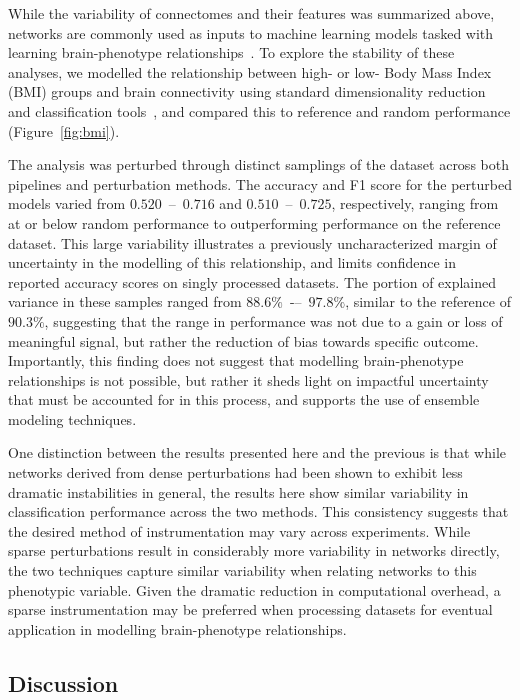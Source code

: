 \documentclass[fleqn,10pt]{SelfArx} %
\newcommand{\new}[1]{{\color{blue} #1}}
\begin{document}
While the variability of connectomes and their features was summarized above, networks are commonly used as inputs to
machine learning models tasked with learning brain-phenotype relationships~\cite{Dubois2016-yr}. To explore the
stability of these analyses, we modelled the relationship between high- or low- Body Mass Index (BMI) groups and brain
connectivity using standard dimensionality reduction and classification tools~\cite{Park2015-uj,Gupta2015-ap}, and
compared this to reference and random performance (Figure~\ref{fig:bmi}).

The analysis was perturbed through distinct samplings of the dataset across both pipelines and perturbation methods.
The accuracy and F1 score for the perturbed models varied from $0.520$~–~$0.716$ and $0.510$~–~$0.725$, respectively,
ranging from at or below random performance to outperforming performance on the reference dataset. This large
variability illustrates a previously uncharacterized margin of uncertainty in the modelling of this relationship, and
limits confidence in reported accuracy scores on singly processed datasets. The portion of explained variance in these
samples ranged from $88.6\%$~-–~$97.8\%$, similar to the reference \new{of $90.3\%$}, suggesting that the range in
performance was not due to a gain or loss of meaningful signal, but rather the reduction of bias towards specific
outcome. Importantly, this finding does not suggest that modelling brain-phenotype relationships is not possible, but
rather it sheds light on impactful uncertainty that must be accounted for in this process, and supports the use of
ensemble modeling techniques.

\new{One distinction between the results presented here and the previous is that while networks derived from dense
perturbations had been shown to exhibit less dramatic instabilities in general, the results here show similar
variability in classification performance across the two methods. This consistency suggests that the desired method of
instrumentation may vary across experiments. While sparse perturbations result in considerably more
variability in networks directly, the two techniques capture similar variability when relating networks to this
phenotypic variable. Given the dramatic reduction in computational overhead, a sparse instrumentation may be preferred
when processing datasets for eventual application in modelling brain-phenotype relationships.}

\subsection*{Discussion}
\end{document}
